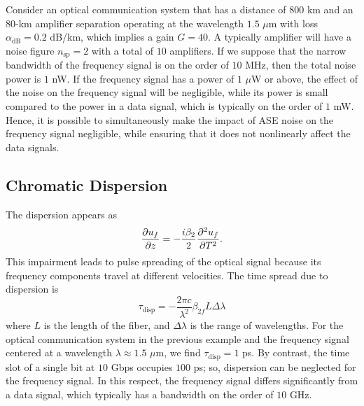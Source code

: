 Consider an optical communication system that has a distance of $800$ km and an $80$-km amplifier separation operating at the wavelength $1.5$ $\mu$m with loss $\alpha_{\text{dB}} = 0.2$ dB/km, which implies a gain $G=40$. A typically amplifier will have a noise figure $n_{\text{sp}} = 2$ with a total of $10$ amplifiers. If we suppose that the narrow bandwidth of the frequency signal is on the order of $10$ MHz, then the total noise power is $1$ nW. If the frequency signal has a power of $1$ $\mu$W or above, the effect of the noise on the frequency signal will be negligible, while its power is small compared to the power in a data signal, which is typically on the order of $1$ mW. Hence, it is possible to simultaneously make the impact of ASE noise on the frequency signal negligible, while ensuring that it does not nonlinearly affect the data signals.

\subsection{Chromatic Dispersion}

The dispersion appears as
%
\begin{equation}
\frac{\partial u_f}{\partial z} = -\frac{i\beta_{2}}{2}\frac{\partial ^2u_f}{\partial T^2}.
\end{equation}
%
This impairment leads to pulse spreading of the optical signal because its frequency components travel at different velocities. The time spread due to dispersion is \cite{agrawal2012fiber}
%
\begin{equation}
\tau_{\text{disp}} = -\frac{2\pi c}{\lambda^2}\beta_{2f} L\Delta \lambda 
\end{equation}
%
where $L$ is the length of the fiber, and $\Delta\lambda$ is the range of wavelengths. For the optical communication system in the previous example and the frequency signal centered at a wavelength $\lambda \approx 1.5$ $\mu$m, we find $\tau_{\text{disp}} = 1$ ps. By contrast, the time slot of a single bit at $10$ Gbps occupies $100$ ps; so, dispersion can be neglected for the frequency signal. In this respect, the frequency signal differs significantly from a data signal, which typically has a bandwidth on the order of $10$ GHz.


